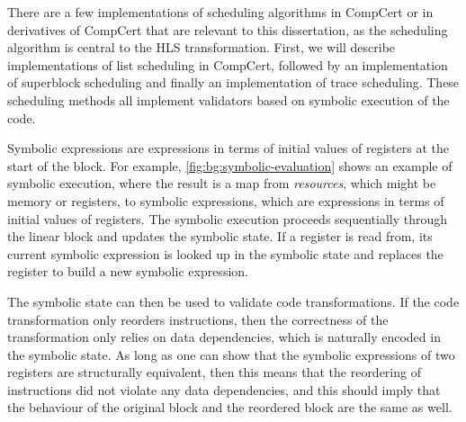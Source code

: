 There are a few implementations of scheduling algorithms in CompCert or in
derivatives of CompCert that are relevant to this dissertation, as the
scheduling algorithm is central to the \gls{HLS} transformation.  First, we will
describe implementations of list scheduling in CompCert, followed by an
implementation of superblock scheduling and finally an implementation of trace
scheduling.  These scheduling methods all implement validators based on symbolic
execution of the code.

Symbolic expressions are expressions in terms of initial values of registers at
the start of the block.  For example, \cref{fig:bg:symbolic-evaluation} shows an
example of symbolic execution, where the result is a map from \emph{resources},
which might be memory or registers, to symbolic expressions, which are
expressions in terms of initial values of registers.  The symbolic execution
proceeds sequentially through the linear block and updates the symbolic state.
If a register is read from, its current symbolic expression is looked up in the
symbolic state and replaces the register to build a new symbolic expression.

The symbolic state can then be used to validate code transformations.  If the
code transformation only reorders instructions, then the correctness of the
transformation only relies on data dependencies, which is naturally encoded in
the symbolic state.  As long as one can show that the symbolic expressions of
two registers are structurally equivalent, then this means that the reordering
of instructions did not violate any data dependencies, and this should imply
that the behaviour of the original block and the reordered block are the same as
well.

